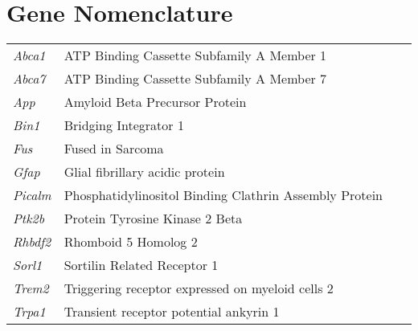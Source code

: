 \chapter*{Gene Nomenclature}

\setlength{\tabcolsep}{12pt}
\begin{tabular}{l p{1.5\linewidth}}
\textit{Abca1}& ATP Binding Cassette Subfamily A Member 1 \\
\textit{Abca7}&  ATP Binding Cassette Subfamily A Member 7 \\
\textit{App}& Amyloid Beta Precursor Protein \\
\textit{Bin1}&Bridging Integrator 1 \\
\textit{Fus}&Fused in Sarcoma \\
\textit{Gfap}&Glial fibrillary acidic protein\\
\textit{Picalm}&Phosphatidylinositol Binding Clathrin Assembly Protein \\
\textit{Ptk2b}&Protein Tyrosine Kinase 2 Beta \\
\textit{Rhbdf2}&Rhomboid 5 Homolog 2 \\
\textit{Sorl1}&Sortilin Related Receptor 1 \\
\textit{Trem2}&Triggering receptor expressed on myeloid cells 2 \\
\textit{Trpa1}&Transient receptor potential ankyrin 1 \\
\end{tabular}

